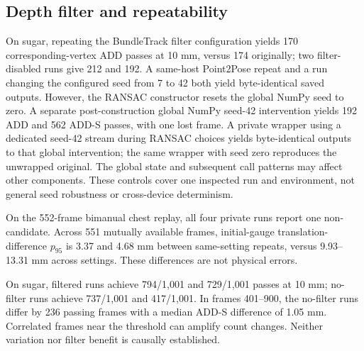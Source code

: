 \documentclass[10pt,journal]{IEEEtran}
\begin{document}
\subsection{Depth filter and repeatability}
On sugar, repeating the BundleTrack filter configuration yields 170 corresponding-vertex ADD passes at 10 mm, versus 174 originally; two filter-disabled runs give 212 and 192. A same-host Point2Pose repeat and a run changing the configured seed from 7 to 42 both yield byte-identical saved outputs. However, the RANSAC constructor resets the global NumPy seed to zero. A separate post-construction global NumPy seed-42 intervention yields 192 ADD and 562 ADD-S passes, with one lost frame. A private wrapper using a dedicated seed-42 stream during RANSAC choices yields byte-identical outputs to that global intervention; the same wrapper with seed zero reproduces the unwrapped original. The global state and subsequent call patterns may affect other components. These controls cover one inspected run and environment, not general seed robustness or cross-device determinism.

On the 552-frame bimanual chest replay, all four private runs report one non-candidate. Across 551 mutually available frames, initial-gauge translation-difference $p_{95}$ is 3.37 and 4.68 mm between same-setting repeats, versus 9.93--13.31 mm across settings. These differences are not physical errors.

On sugar, filtered runs achieve 794/1,001 and 729/1,001 passes at 10 mm; no-filter runs achieve 737/1,001 and 417/1,001. In frames 401--900, the no-filter runs differ by 236 passing frames with a median ADD-S difference of 1.05 mm. Correlated frames near the threshold can amplify count changes. Neither variation nor filter benefit is causally established.
\end{document}
